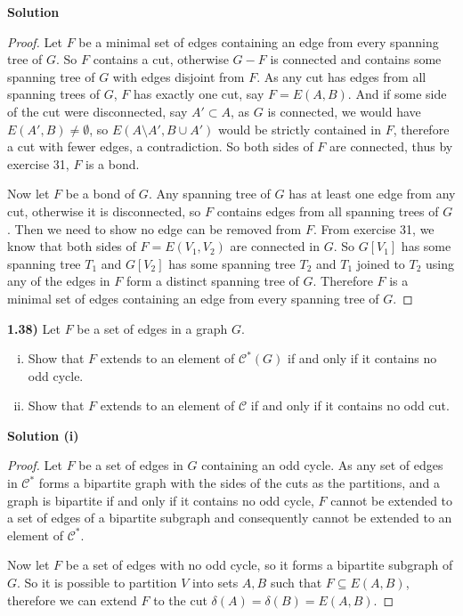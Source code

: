 \documentclass[11pt]{article}
\theoremstyle{plain}
\begin{document}
\vspace{.4cm}
\noindent \textbf{Solution}
\begin{proof}
Let $F$ be a minimal set of edges containing an edge from every spanning tree of $G$. So $F$ contains a cut, otherwise $G-F$ is connected and contains some spanning tree of $G$ with edges disjoint from $F$. As any cut has edges from all spanning trees of $G$, $F$ has exactly one cut, say $F = E(A,B)$. And if some side of the cut were disconnected, say $A' \subset A$, as $G$ is connected, we would have $E(A',B) \neq \emptyset$, so $E(A \setminus A', B \cup A')$ would be strictly contained in $F$, therefore a cut with fewer edges, a contradiction. So both sides of $F$ are connected, thus by exercise 31, $F$ is a bond.


Now let $F$ be a bond of $G$. Any spanning tree of $G$ has at least one edge from any cut, otherwise it is disconnected, so $F$ contains edges from all spanning trees of $G$. Then we need to show no edge can be removed from $F$. From exercise 31, we know that both sides of $F=E(V_1,V_2)$ are connected in $G$. So $G[V_1]$ has some spanning tree $T_1$ and $G[V_2]$ has some spanning tree $T_2$ and $T_1$ joined to $T_2$ using any of the edges in $F$ form a distinct spanning tree of $G$. Therefore $F$ is a minimal set of edges containing an edge from every spanning tree of $G$.
\end{proof}

\textbf{1.38)} Let $F$ be a set of edges in a graph $G$. 

\begin{enumerate}[(i)]
\item Show that $F$ extends to an element of $\mathcal{C}^*(G)$ if and only if it contains no odd cycle.
\item Show that $F$ extends to an element of $\mathcal{C}$ if and only if it contains no odd cut.

\end{enumerate}
\noindent \textbf{Solution (i)}

\begin{proof}
Let $F$ be a set of edges in $G$ containing an odd cycle. As any set of edges in $\mathcal{C}^*$ forms a bipartite graph with the sides of the cuts as the partitions, and a graph is bipartite if and only if it contains no odd cycle, $F$ cannot be extended to a set of edges of a bipartite subgraph and consequently cannot be extended to an element of $\mathcal{C}^*$.

Now let $F$ be a set of edges with no odd cycle, so it forms a bipartite subgraph of $G$. So it is possible to partition $V$ into sets $A,B$ such that $F \subseteq E(A,B)$, therefore we can extend $F$ to the cut $\delta(A) = \delta(B) = E(A,B)$.
\end{proof}
\end{document}
